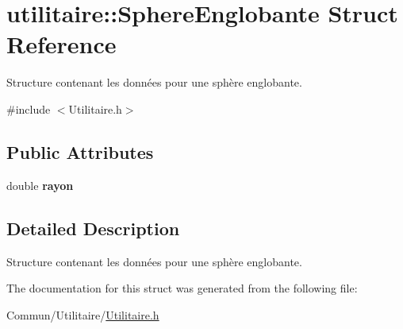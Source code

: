 \hypertarget{structutilitaire_1_1_sphere_englobante}{}\section{utilitaire\+:\+:Sphere\+Englobante Struct Reference}
\label{structutilitaire_1_1_sphere_englobante}


Structure contenant les données pour une sphère englobante.  




{\ttfamily \#include $<$Utilitaire.\+h$>$}

\subsection*{Public Attributes}
\begin{DoxyCompactItemize}
\item 
\hypertarget{structutilitaire_1_1_sphere_englobante_aa340be7e333276aaa7bb2dc18ad33100}{}double {\bfseries rayon}\label{structutilitaire_1_1_sphere_englobante_aa340be7e333276aaa7bb2dc18ad33100}

\end{DoxyCompactItemize}


\subsection{Detailed Description}
Structure contenant les données pour une sphère englobante. 

The documentation for this struct was generated from the following file\+:\begin{DoxyCompactItemize}
\item 
Commun/\+Utilitaire/\hyperlink{_utilitaire_8h}{Utilitaire.\+h}\end{DoxyCompactItemize}
